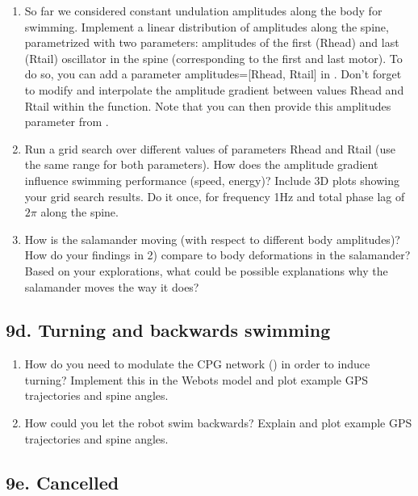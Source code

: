 \documentclass{cmc}
\begin{document}
\begin{enumerate}
\item So far we considered constant undulation amplitudes along the body for
  swimming. Implement a linear distribution of amplitudes along the spine,
  parametrized with two parameters: amplitudes of the first (Rhead) and last
  (Rtail) oscillator in the spine (corresponding to the first and last
  motor). To do so, you can add a parameter amplitudes=[Rhead, Rtail] in
  . Don't forget to modify
  \-
  and interpolate the amplitude gradient between values Rhead and Rtail within
  the function. Note that you can then provide this amplitudes parameter from
  .
\item Run a grid search over different values of parameters Rhead and
  Rtail (use the same range for both parameters). How does the
  amplitude gradient influence swimming performance (speed, energy)?
  Include 3D plots showing your grid search results. Do it once, for
  frequency 1Hz and total phase lag of $2\pi$ along the spine.
\item How is the salamander moving (with respect to different body
  amplitudes)?  How do your findings in 2) compare to body
  deformations in the salamander?  Based on your explorations, what
  could be possible explanations why the salamander moves the way it
  does?
\end{enumerate}


\subsection*{9d. Turning and backwards swimming}
\label{sec:turning-backwards}

\begin{enumerate}
\item How do you need to modulate the CPG network ()
  in order to induce turning?  Implement this in the Webots model and
  plot example GPS trajectories and spine angles.
\item How could you let the robot swim backwards? Explain and plot
  example GPS trajectories and spine angles.
\end{enumerate}



\subsection*{9e. Cancelled}
\end{document}
